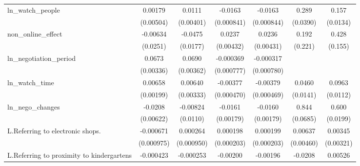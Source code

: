 {\begin{tabular}{l*{6}{c}}
\addlinespace
ln\_watch\_people     &     0.00179         &      0.0111\sym{***}&     -0.0163\sym{***}&     -0.0163\sym{***}&       0.289\sym{***}&       0.157\sym{***}\\
                    &   (0.00504)         &   (0.00401)         &  (0.000841)         &  (0.000844)         &    (0.0390)         &    (0.0134)         \\
\addlinespace
non\_online\_effect   &    -0.00634         &     -0.0475\sym{***}&      0.0237\sym{***}&      0.0236\sym{***}&       0.192         &       0.428\sym{***}\\
                    &    (0.0251)         &    (0.0177)         &   (0.00432)         &   (0.00431)         &     (0.221)         &     (0.155)         \\
\addlinespace
ln\_negotiation\_period&      0.0673\sym{***}&      0.0690\sym{***}&   -0.000369         &   -0.000317         &                     &                     \\
                    &   (0.00336)         &   (0.00362)         &  (0.000777)         &  (0.000780)         &                     &                     \\
\addlinespace
ln\_watch\_time       &     0.00658\sym{***}&     0.00640\sym{*}  &    -0.00377\sym{***}&    -0.00379\sym{***}&      0.0460\sym{***}&      0.0963\sym{***}\\
                    &   (0.00199)         &   (0.00333)         &  (0.000470)         &  (0.000469)         &    (0.0141)         &    (0.0112)         \\
\addlinespace
ln\_nego\_changes     &     -0.0208\sym{***}&    -0.00824         &     -0.0161\sym{***}&     -0.0160\sym{***}&       0.844\sym{***}&       0.600\sym{***}\\
                    &   (0.00622)         &    (0.0110)         &   (0.00179)         &   (0.00179)         &    (0.0685)         &    (0.0199)         \\
\addlinespace
L.Referring to electronic shops.&   -0.000671         &    0.000264         &    0.000198         &    0.000199         &     0.00637         &     0.00345         \\
                    &  (0.000975)         &  (0.000950)         &  (0.000203)         &  (0.000203)         &   (0.00460)         &   (0.00321)         \\
\addlinespace
L.Referring to proximity to kindergartens&   -0.000423         &   -0.000253         &    -0.00200\sym{***}&    -0.00196\sym{***}&     -0.0208\sym{**} &     0.00526         \\

\end{tabular}}
